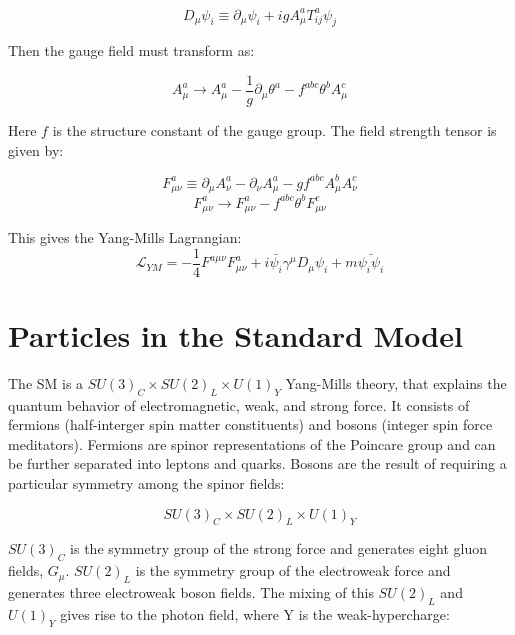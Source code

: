 \begin{equation}
D_{\mu}\psi_{i} \equiv \partial_{\mu}\psi_{i} + igA^{a}_{\mu}T^{a}_{ij}\psi_{j}
\end{equation}

Then the gauge field must transform as:

\begin{equation}
A^{a}_{\mu} \rightarrow A^{a}_{\mu} - \frac{1}{g}\partial_{\mu}\theta^{a} - f^{abc} \theta^{b} A_{\mu}^{c}
\end{equation}

Here $f$ is the structure constant of the gauge group. The field strength tensor is given by:

\begin{equation}
F^{a}_{\mu\nu} \equiv \partial_{\mu}A^{a}_{\nu} - \partial_{\nu}A^{a}_{\mu} - gf^{abc}A^{b}_{\mu}A^{c}_{\nu}
\end{equation}
\begin{equation}
F^{a}_{\mu\nu} \rightarrow F^{a}_{\mu\nu} - f^{abc} \theta^{b}F^{c}_{\mu\nu}
\end{equation}

This gives the Yang-Mills Lagrangian:
\begin{equation}
\mathcal{L}_{YM}= -\frac{1}{4}F^{a\mu\nu}F^{a}_{\mu\nu}+i\bar{\psi_{i}}\gamma^{\mu}D_{\mu}\psi_{i}+m\bar{\psi_{i}\psi_{i}}
\end{equation}
\section{Particles in the Standard Model}
The SM is a $SU(3)_{C} \times SU(2)_{L} \times U(1)_{Y}$ Yang-Mills theory, that explains the quantum behavior of electromagnetic, weak, and strong force. It consists of fermions (half-interger spin matter constituents) and bosons (integer spin force meditators). Fermions are spinor representations of the Poincare group and can be further separated into leptons and quarks. Bosons are the result of requiring a particular symmetry among the spinor fields:

\begin{equation}
SU(3)_{C} \times SU(2)_{L} \times U(1)_{Y}
\end{equation}

$SU(3)_{C}$ is the symmetry group of the strong force and generates eight gluon fields, $G_{\mu}$. $SU(2)_{L}$ is the symmetry group of the electroweak force and generates three electroweak boson fields. The mixing of this $SU(2)_{L}$ and $U(1)_{Y}$ gives rise to the photon field, where Y is the weak-hypercharge:

